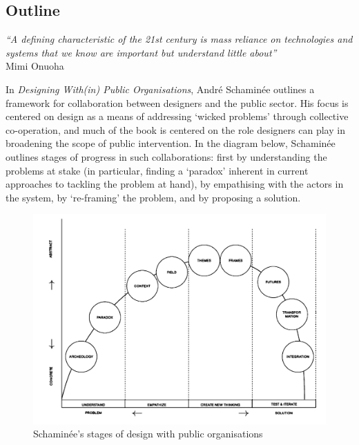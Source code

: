 \documentclass[nofonts,nols,justified,nobib]{tufte-book}
\begin{document}
\subsection*{Outline}

\begin{flushright}
\emph{``A defining characteristic of the 21st century is mass reliance on technologies and systems that we know are important but understand little about''} \cite{onuoha_i_2016}\\
Mimi Onuoha
\end{flushright}

In \emph{Designing With(in) Public Organisations}, Andr\'e Schamin\'ee outlines a framework for collaboration between designers and the public sector. His focus is centered on design as a means of addressing `wicked problems'\cite{rittel_dilemmas_1973} through collective co-operation, and much of the book is centered on the role designers can play in broadening the scope of public intervention. In the diagram below, Schamin\'ee outlines stages of progress in such collaborations: first by understanding the problems at stake (in particular, finding a `paradox' inherent in current approaches to tackling the problem at hand), by empathising with the actors in the system, by `re-framing' the problem, and by proposing a solution. \cite{schaminee_designing_2018}

\begin{figure}
\includegraphics[width=\textwidth]{img/1/design-stages}
\caption{Schamin\'ee's stages of design with public organisations \cite{schaminee_designing_2018}}
\end{figure}
\end{document}
